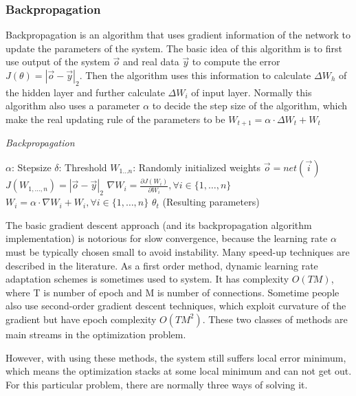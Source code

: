 \documentclass[officiallayout]{tktla}
\begin{document}
\subsubsection{Backpropagation}
Backpropagation is an algorithm that uses gradient information of the network to update the parameters of the system. The basic idea of this algorithm is to first use output of the system $\vec{o}$ and real data $\vec{y}$ to compute the error $J(\theta) = |\vec{o} - \vec{y}|_2$. Then the algorithm uses this information to calculate $\Delta W_h$ of the hidden layer and further calculate $\Delta W_i$ of input layer. Normally this algorithm also uses a parameter $\alpha$ to decide the step size of the algorithm, which make the real updating rule of the parameters to be $W_ {t+1}=\alpha \cdot \Delta W_t + W_t$
\begin{algorithm}[ht]
\caption{\emph{Backpropagation}}
\label{algo:backpropagation}
\begin{algorithmic}
\REQUIRE $\alpha$: Stepsize
\REQUIRE $\delta$: Threshold
\REQUIRE $W_{1\ldots n}$: Randomly initialized weights
\STATE $\vec{o} = net\left(\vec{i}\right)$
\STATE $J(W_{1,\ldots,n}) = |\vec{o} - \vec{y}|_2$
\STATE $ \nabla W_i = \frac{\partial J(W_i)}{\partial W_i}, \forall i \in \{1, \ldots, n\}$
\STATE $ W_i = \alpha \cdot \nabla W_i  + W_i, \forall i \in \{1, \ldots, n\}$
\ENDWHILE
\RETURN $\theta_t$ (Resulting parameters)
\end{algorithmic}
\vspace{-0.05in}
\end{algorithm}

The basic gradient descent approach (and its backpropagation algorithm implementation) is notorious for slow convergence, because the learning rate $\alpha$ must be typically chosen small to avoid instability. Many speed-up techniques are described in the literature. As a first order method, dynamic learning rate adaptation schemes is sometimes used to system. It has complexity $O(TM)$, where T is number of epoch and M is number of connections. Sometime people also use second-order gradient descent techniques, which exploit curvature of the gradient but have epoch complexity $O(TM^2)$. These two classes of methods are main streams in the optimization problem. 

However, with using these methods, the system still suffers local error minimum, which means the optimization stacks at some local minimum and can not get out. For this particular problem, there are normally three ways of solving it.
\end{document}

